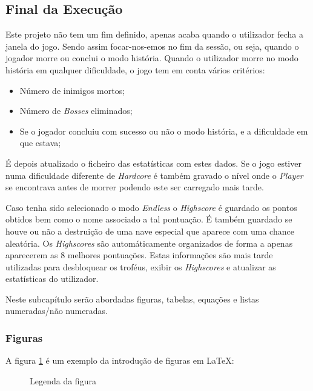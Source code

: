 \documentclass[a4paper,11pt]{article}
\newcommand\tabitem{\setlength{\itemindent}{1cm}}
\newcommand\tab[1][0.8cm]{\hspace*{#1}}
\begin{document}
\subsection{Final da Execução}
\tab Este projeto não tem um fim definido, apenas acaba quando o utilizador fecha a janela do jogo. Sendo assim focar-nos-emos no fim da sessão, ou seja, quando o jogador morre ou conclui o modo história. Quando o utilizador morre no modo história em qualquer dificuldade, o jogo tem em conta vários critérios:
\begin{itemize}
    \tabitem
    \item Número de inimigos mortos;
    \item Número de \textit{Bosses} eliminados;
    \item Se o jogador concluiu com sucesso ou não o modo história, e a dificuldade em que estava;
\end{itemize}
É depois atualizado o ficheiro das estatísticas com estes dados. Se o jogo estiver numa dificuldade diferente de \textit{Hardcore} é também gravado o nível onde o \textit{Player} se encontrava antes de morrer podendo este ser carregado mais tarde. 

\vspace{8pt}

Caso tenha sido selecionado o modo \textit{Endless} o \textit{Highscore} é guardado os pontos obtidos bem como o nome associado a tal pontuação. É também guardado se houve ou não a destruição de uma nave especial que aparece com uma chance aleatória. Os \textit{Highscores} são automáticamente organizados de forma a apenas aparecerem as 8 melhores pontuações.
Estas informações são mais tarde utilizadas para desbloquear os troféus, exibir os \textit{Highscores} e atualizar as estatísticas	do utilizador.

\pagebreak

\tab Neste subcapítulo serão abordadas figuras, tabelas, equações e listas numeradas/não numeradas.

\subsubsection{Figuras}

\tab A figura \ref{fig:exemplo} é um exemplo da introdução de figuras em \LaTeX:

\begin{figure}[!ht]
    \centering
    \caption{Legenda da figura}
    \label{fig:exemplo}
\end{figure}
\end{document}
